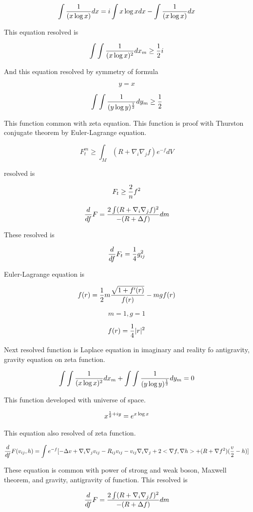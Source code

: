 \documentclass{jsarticle}
\begin{document}
  $$ \int {1 \over (x \log x)}dx = i \int x \log xdx - \int {1 \over (x \log x)}dx $$

  This equation resolved is

  $$ \int \int {1 \over (x \log x)^2}dx_{m} \ge {1 \over 2}i $$

  And this equation resolved by symmetry of formula

  $$ y = x $$

  $$ \int \int {1 \over (y \log y)^{1 \over 2}}dy_{m} \ge {1 \over 2} $$

  This function common with zeta equation. This function is proof with Thurston conjugate theorem by Euler-Lagrange
equation.

  $$ F^m_{t} \ge \int_{M} (R + \nabla_{i} \nabla_{j} f)e^{-f}dV $$

  resolved is

  $$ F_{t} \ge {2 \over n}f^2  $$

  $$ {d \over df}F = {2 \int (R + \nabla_{i} \nabla_{j} f)^2 \over - (R + \Delta f)}dm $$

  These resolved is

  $$ {d \over df}F_{t} = {1 \over 4}g^2_{ij} $$

  Euler-Lagrange equation is

  $$ f(r) = {1 \over 2}m{\sqrt{1 + f'(r)} \over f(r)} - mgf(r) $$

  $$ m = 1, g = 1 $$

  $$ f(r) = {1 \over 4}|r|^2 $$

  Next resolved function is Laplace equation in imaginary and reality fo antigravity, gravity equation on
zeta function.

$$ \int \int {1 \over (x \log x)^2}dx_{m} + \int \int {1 \over (y \log y)^{1 \over 2}}dy_{m} = 0  $$

  This function developed with universe of space.

  $$ x^{{1 \over 2} + iy} = e^{x \log x} $$
  
  This equation also resolved of zeta function.
 

  $$ {d \over df} F(v_{ij},h) = \int e^{-f} [- \Delta v + \nabla_{i} \nabla_{j} v_{ij} - R_{ij} v_{ij} 
  - v_{ij} \nabla_{i} \nabla_{j} + 2 < \nabla f, \nabla h> + (R + \nabla f^2)({v \over 2} - h)]  $$

  These equation is common with power of strong and weak boson, Maxwell theorem, and gravity, antigravity
of function. This resolved is

$$ {d \over df}F = {2 \int (R + \nabla_{i} \nabla_{j} f)^2 \over - (R + \Delta f)}dm $$
\end{document}

